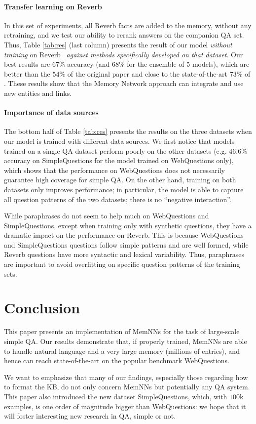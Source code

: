 \documentclass[11pt,a4paper]{article}
\newcommand{\wq}{{\sf WebQuestions}\xspace}
\newcommand{\rv}{{\sf Reverb}\xspace}
\newcommand{\fbq}{{\sf SimpleQuestions}\xspace}
\begin{document}
\paragraph{Transfer learning on Reverb}

In this set of experiments, all \rv facts are added to the memory,
without any retraining, and we test our ability to rerank answers on
the companion QA set. Thus, Table \ref{tab:res} (last column) presents
the result of our model {\it without training} on \rv~ {\it against
  methods specifically developed on that dataset}. Our best results
are $67\%$ accuracy (and $68\%$ for the ensemble of $5$ models), which
are better than the $54\%$ of the original paper and close to the
state-of-the-art $73\%$ of \cite{bordes2014open}. These results show
that the Memory Network approach can integrate and use new entities and
links.





\paragraph{Importance of data sources}

The bottom half of Table \ref{tab:res} presents the results on the
three datasets when our model is trained with different data
sources. We first notice that models trained on a single QA dataset
perform poorly on the other datasets (e.g. $46.6\%$ accuracy on \fbq for the
model trained on \wq only), which shows that the performance on \wq
does not necessarily guarantee high coverage for simple QA. On the
other hand, training on both datasets only improves performance; in
particular, the model is able to capture all question patterns of the
two datasets; there is no ``negative interaction''.

While paraphrases do not seem to help much on \wq and \fbq, except
when training only with synthetic questions, they have a dramatic
impact on the performance on \rv. This is because \wq and \fbq
questions follow simple patterns and are well formed, while \rv
questions have more syntactic and lexical variability. Thus,
paraphrases are important to avoid overfitting on specific question
patterns of the training sets.


\section{Conclusion}

  This paper presents an implementation of MemNNs for the task
  of large-scale simple QA.
Our results demonstrate that, if properly trained, MemNNs are able
  to handle natural language and a very large memory (millions of
  entries), and hence can reach state-of-the-art on the popular
  benchmark \wq.


 We want to emphasize that many of our findings, especially those
 regarding how to format the KB, do not only concern MemNNs but
 potentially any QA system.
This paper also introduced the new dataset \fbq, which, with $100$k
 examples, is one order of magnitude bigger than \wq: we hope that it
 will foster interesting new research in QA, simple or not.





\end{document}
